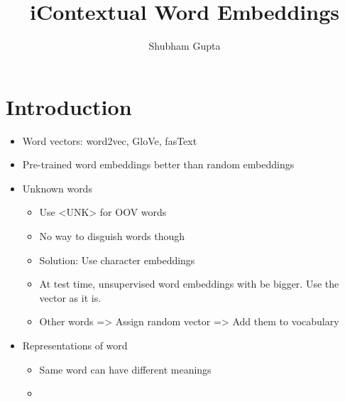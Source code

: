 \documentclass[a4paper]{article}
\title{iContextual Word Embeddings}
\author{Shubham Gupta}
\begin{document}
\maketitle
\section{Introduction}
\begin{itemize}
    \item Word vectors: word2vec, GloVe, fasText
    \item Pre-trained word embeddings better than random embeddings
    \item Unknown words
    \begin{itemize}
        \item Use <UNK> for OOV words
        \item No way to disguish words though
        \item Solution: Use character embeddings
        \item At test time, unsupervised word embeddings with be bigger. Use the vector as it is.
        \item Other words => Assign random vector => Add them to vocabulary
    \end{itemize}
    \item Representations of word
    \begin{itemize}
        \item Same word can have different meanings
        \item 
    \end{itemize}
\end{itemize}
\end{document}
